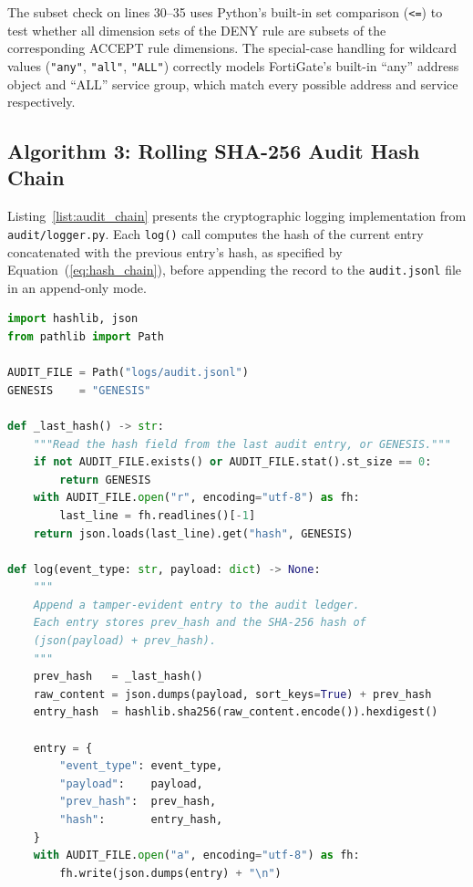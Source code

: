 The subset check on lines 30--35 uses Python's built-in set comparison (\texttt{<=}) to test whether all dimension sets of the DENY rule are subsets of the corresponding ACCEPT rule dimensions. The special-case handling for wildcard values (\texttt{"any"}, \texttt{"all"}, \texttt{"ALL"}) correctly models FortiGate's built-in ``any'' address object and ``ALL'' service group, which match every possible address and service respectively.

\subsection{Algorithm 3: Rolling SHA-256 Audit Hash Chain}
\label{subsec:list_audit}

Listing~\ref{list:audit_chain} presents the cryptographic logging implementation from \texttt{audit/logger.py}. Each \texttt{log()} call computes the hash of the current entry concatenated with the previous entry's hash, as specified by Equation~(\ref{eq:hash_chain}), before appending the record to the \texttt{audit.jsonl} file in an append-only mode.

\begin{lstlisting}[language=Python, caption={Rolling SHA-256 Audit Hash Chain (\texttt{audit/logger.py})}, label={list:audit_chain}]
import hashlib, json
from pathlib import Path

AUDIT_FILE = Path("logs/audit.jsonl")
GENESIS    = "GENESIS"

def _last_hash() -> str:
    """Read the hash field from the last audit entry, or GENESIS."""
    if not AUDIT_FILE.exists() or AUDIT_FILE.stat().st_size == 0:
        return GENESIS
    with AUDIT_FILE.open("r", encoding="utf-8") as fh:
        last_line = fh.readlines()[-1]
    return json.loads(last_line).get("hash", GENESIS)

def log(event_type: str, payload: dict) -> None:
    """
    Append a tamper-evident entry to the audit ledger.
    Each entry stores prev_hash and the SHA-256 hash of
    (json(payload) + prev_hash).
    """
    prev_hash   = _last_hash()
    raw_content = json.dumps(payload, sort_keys=True) + prev_hash
    entry_hash  = hashlib.sha256(raw_content.encode()).hexdigest()

    entry = {
        "event_type": event_type,
        "payload":    payload,
        "prev_hash":  prev_hash,
        "hash":       entry_hash,
    }
    with AUDIT_FILE.open("a", encoding="utf-8") as fh:
        fh.write(json.dumps(entry) + "\n")
\end{lstlisting}

